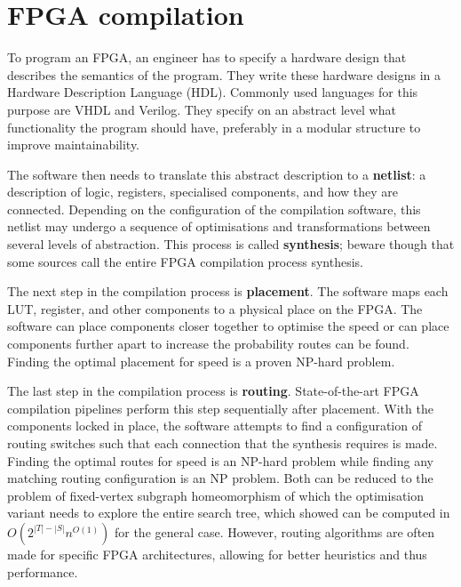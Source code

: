 \section{FPGA compilation}
\label{sec:compilation}
To program an FPGA, an engineer has to specify a hardware design that describes the semantics of the program. They write these hardware designs in a Hardware Description Language (HDL). Commonly used languages for this purpose are VHDL and Verilog. They specify on an abstract level what functionality the program should have, preferably in a modular structure to improve maintainability.

The software then needs to translate this abstract description to a \textbf{netlist}: a description of logic, registers, specialised components, and how they are connected. Depending on the configuration of the compilation software, this netlist may undergo a sequence of optimisations and transformations between several levels of abstraction. This process is called \textbf{synthesis}; beware though that some sources call the entire FPGA compilation process synthesis.

The next step in the compilation process is \textbf{placement}. The software maps each LUT, register, and other components to a physical place on the FPGA. The software can place components closer together to optimise the speed or can place components further apart to increase the probability routes can be found. Finding the optimal placement for speed is a proven NP-hard problem.

The last step in the compilation process is \textbf{routing}. State-of-the-art FPGA compilation pipelines perform this step sequentially after placement\cite{alhyari2019}. With the components locked in place, the software attempts to find a configuration of routing switches such that each connection that the synthesis requires is made. Finding the optimal routes for speed is an NP-hard problem while finding any matching routing configuration is an NP problem. Both can be reduced to the problem of fixed-vertex subgraph homeomorphism of which the optimisation variant needs to explore the entire search tree, which \cite{ExactComplexity} showed can be computed in $O(2^{|T|-|S|}n^{O(1)})$ for the general case. However, routing algorithms are often made for specific FPGA architectures, allowing for better heuristics and thus performance.

